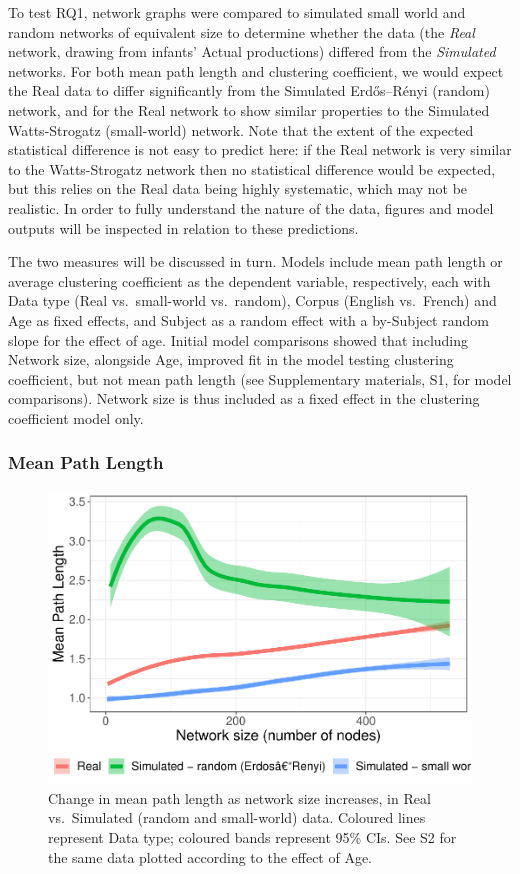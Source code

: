 \documentclass[
  man]{apa6}
\begin{document}
To test RQ1, network graphs were compared to simulated small world and random networks of equivalent size to determine whether the data (the \emph{Real} network, drawing from infants' Actual productions) differed from the \emph{Simulated} networks. For both mean path length and clustering coefficient, we would expect the Real data to differ significantly from the Simulated Erdős--Rényi (random) network, and for the Real network to show similar properties to the Simulated Watts-Strogatz (small-world) network. Note that the extent of the expected statistical difference is not easy to predict here: if the Real network is very similar to the Watts-Strogatz network then no statistical difference would be expected, but this relies on the Real data being highly systematic, which may not be realistic. In order to fully understand the nature of the data, figures and model outputs will be inspected in relation to these predictions.

The two measures will be discussed in turn. Models include mean path length or average clustering coefficient as the dependent variable, respectively, each with Data type (Real vs.~small-world vs.~random), Corpus (English vs.~French) and Age as fixed effects, and Subject as a random effect with a by-Subject random slope for the effect of age. Initial model comparisons showed that including Network size, alongside Age, improved fit in the model testing clustering coefficient, but not mean path length (see Supplementary materials, S1, for model comparisons). Network size is thus included as a fixed effect in the clustering coefficient model only.

\hypertarget{mean-path-length}{%
\subsubsection{Mean Path Length}\label{mean-path-length}}

\begin{figure}
\centering
\includegraphics{NetworkGraphs_files/figure-latex/Figure-path-length-1.pdf}
\caption{\label{fig:Figure-path-length}Change in mean path length as network size increases, in Real vs.~Simulated (random and small-world) data. Coloured lines represent Data type; coloured bands represent 95\% CIs. See S2 for the same data plotted according to the effect of Age.}
\end{figure}
\end{document}
